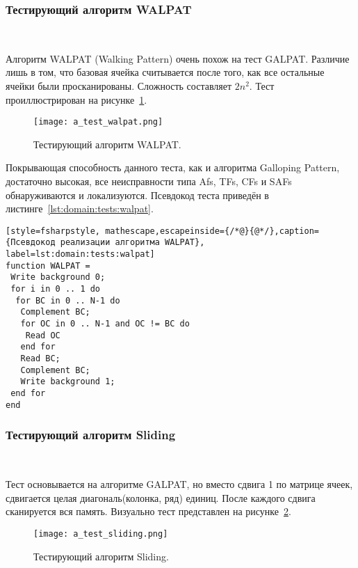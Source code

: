 \subsubsection{Тестирующий алгоритм WALPAT}~\\
\label{page:domain:tests:walpat}

Алгоритм WALPAT (Walking Pattern) очень похож на тест GALPAT. Различие лишь в том, что базовая ячейка считывается после того, как все остальные ячейки были просканированы. Сложность составляет $ 2n^{2} $. Тест проиллюстрирован на рисунке~\ref{fig:domain:tests:walpat}.

\begin{figure}[ht]
\centering
  \texttt{[image: a\_test\_walpat.png]}  
  \caption{ Тестирующий алгоритм WALPAT. }
  \label{fig:domain:tests:walpat}
\end{figure}

Покрывающая способность данного теста, как и алгоритма Galloping Pattern, достаточно высокая, все неисправности типа Afs, TFs, CFs и SAFs обнаруживаются и локализуются. Псевдокод теста приведён в листинге~\ref{lst:domain:tests:walpat}.

\begin{lstlisting}[style=fsharpstyle, mathescape,escapeinside={/*@}{@*/},caption={Псевдокод реализации алгоритма WALPAT}, label=lst:domain:tests:walpat]
function WALPAT =
 Write background 0;
 for i in 0 .. 1 do
  for BC in 0 .. N-1 do
   Complement BC;
   for OC in 0 .. N-1 and OC != BC do
    Read OC
   end for
   Read BC;
   Complement BC;
   Write background 1;
 end for
end
\end{lstlisting}

\subsubsection{Тестирующий алгоритм Sliding}~\\
\label{page:domain:tests:sliding}

Тест основывается на алгоритме GALPAT, но вместо сдвига 1 по матрице ячеек, сдвигается целая диагональ(колонка, ряд) единиц. После каждого сдвига сканируется вся память. Визуально тест представлен на рисунке~\ref{fig:domain:tests:sliding}.

\begin{figure}[ht]
\centering
  \texttt{[image: a\_test\_sliding.png]}  
  \caption{ Тестирующий алгоритм Sliding. }
  \label{fig:domain:tests:sliding}
\end{figure} 

